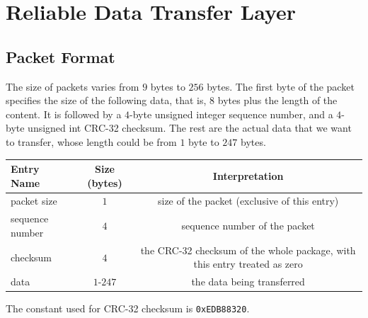 \documentclass[10pt,a4paper]{article}
\begin{document}
\section{Reliable Data Transfer Layer}
\subsection{Packet Format}
    The size of packets varies from $9$ bytes to $256$ bytes. The first byte of the packet specifies the size of the following data, that is, $8$ bytes plus the length of the content. It is followed by a $4$-byte unsigned integer sequence number, and a $4$-byte unsigned int CRC-32 checksum. The rest are the actual data that we want to transfer, whose length could be from $1$ byte to $247$ bytes.

\begin{center}
    \begin{tabular}{lcc}
        Entry Name & Size (bytes) & Interpretation \\%
            \hline
        packet size & $1$ &  size of the packet (exclusive of this entry)\\ 
        sequence number & $4$ & sequence number of the packet\\
        checksum & $4$ & the CRC-32 checksum of the whole package, with this entry treated as zero\\
        data & $1$-$247$ & the data being transferred\\
    \end{tabular}
\end{center}

The constant used for CRC-32 checksum is \texttt{0xEDB88320}.
    
\end{document}
